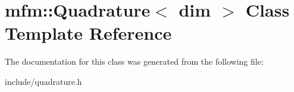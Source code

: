 \hypertarget{classmfm_1_1_quadrature}{}\section{mfm\+:\+:Quadrature$<$ dim $>$ Class Template Reference}
\label{classmfm_1_1_quadrature}


The documentation for this class was generated from the following file\+:\begin{DoxyCompactItemize}
\item 
include/quadrature.\+h\end{DoxyCompactItemize}
